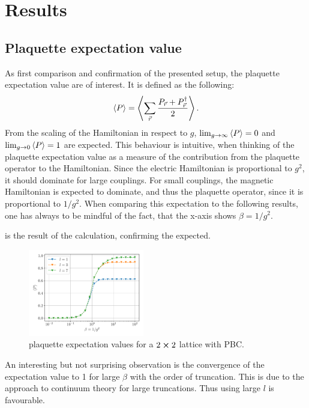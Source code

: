 \section{Results}
\subsection{Plaquette expectation value}
As first comparison and confirmation of the presented setup, the plaquette expectation value are of interest. It is defined as the following:
\begin{align}
	\Braket{P} = \Braket{\sum_{\vec{r}}\frac{P_{\vec{r}}+P_{\vec{r}}^{\dag}}{2}}.
\end{align}
From the scaling of the Hamiltonian in respect to $g$, $\lim_{g\rightarrow\infty}\Braket{P}=0$ and $\lim_{g\rightarrow0}\Braket{P}=1$ are expected.
This behaviour is intuitive, when thinking of the plaquette expectation value as a measure of the contribution from the plaquette operator to the Hamiltonian. Since the electric Hamiltonian is proportional to $g^2$, it should dominate for large couplings. For small couplings, the magnetic Hamiltonian is expected to dominate, and thus the plaquette operator, since it is proportional to $1/g^2$. When comparing this expectation to the following results, one has always to be mindful of the fact, that the x-axis shows $\beta=1/g^2$.

 is the result of the calculation, confirming the expected.
\begin{figure}[h]
	\begin{center}
		\includegraphics[width=0.45\textwidth]{images/PlaquetteExp2x2PBC.pdf}
	\end{center}
	\caption{plaquette expectation values for a $2\cross2$ lattice with PBC.}\label{fig:2exp}
\end{figure}
An interesting but not surprising observation is the convergence of the expectation value to 1 for large $\beta$ with the order of truncation. This is due to the approach to continuum theory for large truncations. Thus using large $l$ is favourable.

